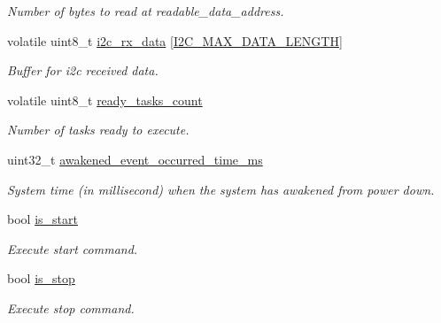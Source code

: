 \begin{DoxyCompactItemize}
\begin{DoxyCompactList}\small\item\em Number of bytes to read at readable\+\_\+data\+\_\+address. \end{DoxyCompactList}\item 
\mbox{\label{i2c-rain_8h_ae22f16db01d254c3709565e8347c05af}} 
volatile uint8\+\_\+t \hyperlink{i2c-rain_8h_ae22f16db01d254c3709565e8347c05af}{i2c\+\_\+rx\+\_\+data} \mbox{[}\hyperlink{hardware__config_8h_aa552d72ce15dd8ca167c4b9323f1f25d}{I2\+C\+\_\+\+M\+A\+X\+\_\+\+D\+A\+T\+A\+\_\+\+L\+E\+N\+G\+TH}\mbox{]}
\begin{DoxyCompactList}\small\item\em Buffer for i2c received data. \end{DoxyCompactList}\item 
\mbox{\label{i2c-rain_8h_ad51737114d6776c16525958973815d50}} 
volatile uint8\+\_\+t \hyperlink{i2c-rain_8h_ad51737114d6776c16525958973815d50}{ready\+\_\+tasks\+\_\+count}
\begin{DoxyCompactList}\small\item\em Number of tasks ready to execute. \end{DoxyCompactList}\item 
\mbox{\label{i2c-rain_8h_a82dc7d1671e2febacdbd9a3c3a3283cd}} 
uint32\+\_\+t \hyperlink{i2c-rain_8h_a82dc7d1671e2febacdbd9a3c3a3283cd}{awakened\+\_\+event\+\_\+occurred\+\_\+time\+\_\+ms}
\begin{DoxyCompactList}\small\item\em System time (in millisecond) when the system has awakened from power down. \end{DoxyCompactList}\item 
\mbox{\label{i2c-rain_8h_a2a9792771d5af0df80ed2adf7c5dc0cf}} 
bool \hyperlink{i2c-rain_8h_a2a9792771d5af0df80ed2adf7c5dc0cf}{is\+\_\+start}
\begin{DoxyCompactList}\small\item\em Execute start command. \end{DoxyCompactList}\item 
\mbox{\label{i2c-rain_8h_ad2dc9b34342f31d98c692c9b5ff3c5a9}} 
bool \hyperlink{i2c-rain_8h_ad2dc9b34342f31d98c692c9b5ff3c5a9}{is\+\_\+stop}
\begin{DoxyCompactList}\small\item\em Execute stop command. \end{DoxyCompactList}\item 

\end{DoxyCompactItemize}
